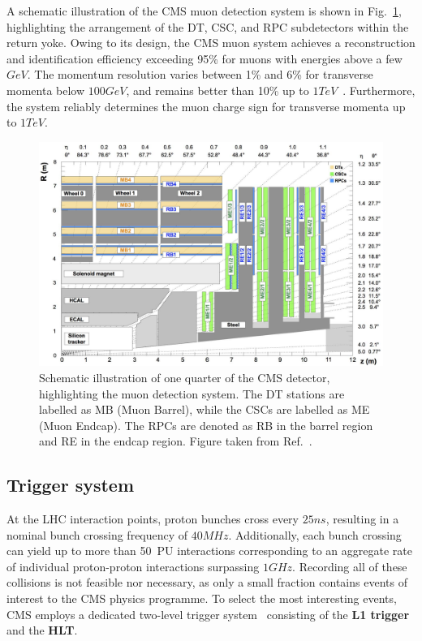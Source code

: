 A schematic illustration of the CMS muon detection system is shown in Fig.~\ref{Figure:Chapter3_CMS_Muon_System}, highlighting the arrangement of the DT, CSC, and RPC subdetectors within the return yoke. Owing to its design, the CMS muon system achieves a reconstruction and identification efficiency exceeding 95\% for muons with energies above a few $\unit{GeV}$. The momentum resolution varies between 1\% and 6\% for transverse momenta below $100\unit{GeV}$, and remains better than 10\% up to $1\unit{TeV}$~\cite{CMS_Muon_System_Performance_2}. Furthermore, the system reliably determines the muon charge sign for transverse momenta up to $1\unit{TeV}$.


\begin{figure}[h]
\centering
\includegraphics[width= 1.0\textwidth]{Figures/Chapter3/CMS_Muon_System.pdf}
\caption[Schematic of CMS muon detection system]{Schematic illustration of one quarter of the CMS detector, highlighting the muon detection system. The DT stations are labelled as MB (Muon Barrel), while the CSCs are labelled as ME (Muon Endcap). The RPCs are denoted as RB in the barrel region and RE in the endcap region. Figure taken from Ref.~\cite{CMS_Muon_System_Performance}.}
\label{Figure:Chapter3_CMS_Muon_System}
\end{figure}

\subsection{Trigger system}

At the LHC interaction points, proton bunches cross every $25\unit{ns}$, resulting in a nominal bunch crossing frequency of $40\unit{MHz}$. Additionally, each bunch crossing can yield up to more than 50~PU interactions corresponding to an aggregate rate of individual proton-proton interactions surpassing $1\unit{GHz}$. Recording all of these collisions is not feasible nor necessary, as only a small fraction contains events of interest to the CMS physics programme. To select the most interesting events, CMS employs a dedicated two-level trigger system~\cite{CMS_Trigger} consisting of the \textbf{\ac{L1} trigger} and the \textbf{\ac{HLT}}.

